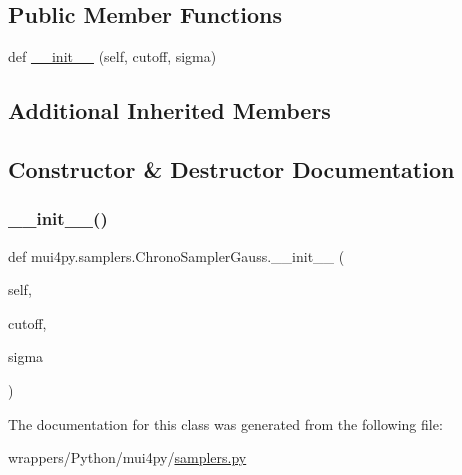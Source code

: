 \subsection*{Public Member Functions}
\begin{DoxyCompactItemize}
\item 
def \hyperlink{classmui4py_1_1samplers_1_1_chrono_sampler_gauss_a61feab9954de87869a5248e26c450826}{\+\_\+\+\_\+init\+\_\+\+\_\+} (self, cutoff, sigma)
\end{DoxyCompactItemize}
\subsection*{Additional Inherited Members}


\subsection{Constructor \& Destructor Documentation}
\mbox{\label{classmui4py_1_1samplers_1_1_chrono_sampler_gauss_a61feab9954de87869a5248e26c450826}} 
\subsubsection{\texorpdfstring{\+\_\+\+\_\+init\+\_\+\+\_\+()}{\_\_init\_\_()}}
{\footnotesize\ttfamily def mui4py.\+samplers.\+Chrono\+Sampler\+Gauss.\+\_\+\+\_\+init\+\_\+\+\_\+ (\begin{DoxyParamCaption}\item[{}]{self,  }\item[{}]{cutoff,  }\item[{}]{sigma }\end{DoxyParamCaption})}



The documentation for this class was generated from the following file\+:\begin{DoxyCompactItemize}
\item 
wrappers/\+Python/mui4py/\hyperlink{samplers_8py}{samplers.\+py}\end{DoxyCompactItemize}
